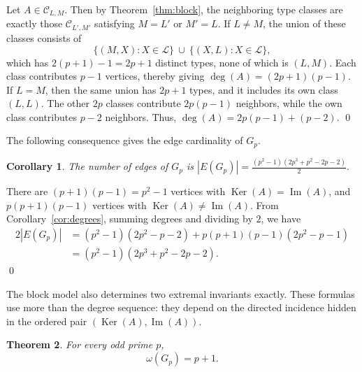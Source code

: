 \documentclass[12pt]{article}
\renewenvironment{proof}{{\bf \noindent Proof.}}{\qed}
\newtheorem{theorem}{Theorem}[section]
\newtheorem{corollary}[theorem]{Corollary}
\theoremstyle{definition}
\newcommand{\calL}{\mathcal{L}}
\newcommand{\calC}{\mathcal{C}}
\newcommand{\Ker}{\operatorname{Ker}}
\newcommand{\Image}{\operatorname{Im}}
\begin{document}
	\begin{proof}
		Let $A\in \calC_{L,M}$. Then by Theorem~\ref{thm:block}, the neighboring type classes are exactly those $\calC_{L',M'}$ satisfying $M=L'$ or $M'=L$. If $L\neq M$, the union of these classes consists of
		$$
		\{(M,X): X\in \calL\}\ \cup\ \{(X,L): X\in\calL\},
		$$
		which has $2(p+1)-1=2p+1$ distinct types, none of which is $(L,M)$. Each class contributes $p-1$ vertices, thereby giving
		$\deg(A)=(2p+1)(p-1).$ If $L=M$, then the same union has $2p+1$ types, and it  includes its own class $(L,L)$. The other $2p$ classes contribute $2p(p-1)$ neighbors, while the own class contributes $p-2$ neighbors. Thus, $\deg(A)=2p(p-1)+(p-2).$ 
	\end{proof}
	
	\medskip
	The following consequence gives the edge cardinality of $G_{p}.$
	\begin{corollary}\label{cor:edges}
		The number of edges of $G_p$ is $|E(G_p)|=\frac{(p^2-1)(2p^3+p^2-2p-2)}{2}.$ 
	\end{corollary}
	
	\begin{proof}
		There are $(p+1)(p-1)=p^2-1$ vertices with $\Ker(A)=\Image(A)$, and $p(p+1)(p-1)$ vertices with $\Ker(A)\neq \Image(A)$. From Corollary~\ref{cor:degrees}, summing degrees and dividing by $2$, we have
		\begin{align*}
			2|E(G_p)|
			&=(p^2-1)(2p^2-p-2)+p(p+1)(p-1)(2p^2-p-1)\\
			&=(p^2-1)(2p^3+p^2-2p-2).
		\end{align*}
	\end{proof}
	
	\medskip
	The block model also determines two extremal invariants exactly. These formulas use more than the degree sequence: they depend on the directed incidence hidden in the ordered pair $(\Ker(A),\Image(A))$.
	
	\begin{theorem}\label{thm:cliqueodd}
		For every odd prime $p$,
		$$
		\omega(G_p)=p+1.
		$$
	\end{theorem}
	
\end{document}
